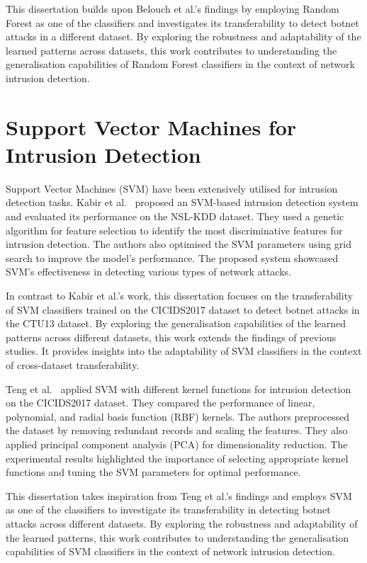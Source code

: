 This dissertation builds upon Belouch et al.’s findings by employing Random Forest as one of the classifiers and investigates its transferability to detect botnet attacks in a different dataset. By exploring the robustness and adaptability of the learned patterns across datasets, this work contributes to understanding the generalisation capabilities of Random Forest classifiers in the context of network intrusion detection.

\section{Support Vector Machines for Intrusion Detection}

Support Vector Machines (SVM) have been extensively utilised for intrusion detection tasks. Kabir et al.~\cite{kabir2017network} proposed an SVM-based intrusion detection system and evaluated its performance on the NSL-KDD dataset. They used a genetic algorithm for feature selection to identify the most discriminative features for intrusion detection. The authors also optimised the SVM parameters using grid search to improve the model’s performance. The proposed system showcased SVM’s effectiveness in detecting various types of network attacks.

In contrast to Kabir et al.’s work, this dissertation focuses on the transferability of SVM classifiers trained on the CICIDS2017 dataset to detect botnet attacks in the CTU13 dataset. By exploring the generalisation capabilities of the learned patterns across different datasets, this work extends the findings of previous studies. It provides insights into the adaptability of SVM classifiers in the context of cross-dataset transferability.

Teng et al.~\cite{teng2017svm} applied SVM with different kernel functions for intrusion detection on the CICIDS2017 dataset. They compared the performance of linear, polynomial, and radial basis function (RBF) kernels. The authors preprocessed the dataset by removing redundant records and scaling the features. They also applied principal component analysis (PCA) for dimensionality reduction. The experimental results highlighted the importance of selecting appropriate kernel functions and tuning the SVM parameters for optimal performance.

This dissertation takes inspiration from Teng et al.’s findings and employs SVM as one of the classifiers to investigate its transferability in detecting botnet attacks across different datasets. By exploring the robustness and adaptability of the learned patterns, this work contributes to understanding the generalisation capabilities of SVM classifiers in the context of network intrusion detection.

